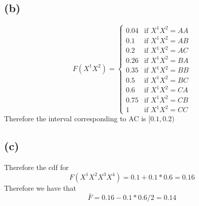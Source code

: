 \subsection*{(b)}
$$F(X^1X^2)=\begin{cases}
    0.04 & \text{if }X^1X^2=AA\\
    0.1 & \text{if }X^1X^2=AB\\
    0.2 & \text{if }X^1X^2=AC\\
    0.26 & \text{if }X^1X^2=BA\\
    0.35 & \text{if }X^1X^2=BB\\
    0.5 & \text{if }X^1X^2=BC\\
    0.6 & \text{if }X^1X^2=CA\\
    0.75 & \text{if }X^1X^2=CB\\
    1 & \text{if }X^1X^2=CC
\end{cases}$$
Therefore the interval corresponding to AC is 
$[0.1,0.2)$
\subsection*{(c)}
Therefore the cdf for 
$$F(X^1X^2X^3X^4)=0.1+0.1*0.6=0.16$$
Therefore we have that 
$$\bar{F}=0.16-0.1*0.6/2=0.14$$
